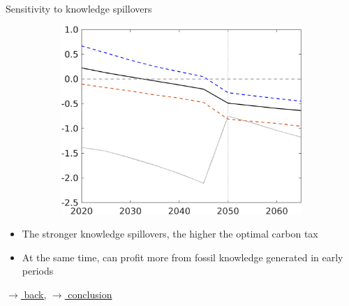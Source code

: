 \documentclass[11pt,aspectratio=169]{beamer}
\begin{document}
\begin{frame}{Sensitivity to knowledge spillovers}
\begin{figure}[h!!]
\begin{subfigure}{0.42\textwidth}
			\includegraphics[width=1\textwidth]{../codding_model/own_basedOnFried/optimalPol_010922_revision/figures/all_13Sept22/NewCalib_Sens_TvsNoT_dTaulAv_emnet1_Sun2_spillover0_knspil3_xgr0_nsk0_sep0_extern0_PV1_etaa0.79_lgd0.png}
		\end{subfigure}
	\end{figure}
	\vspace{2mm}
	\begin{block}{}
		\begin{itemize}
			\item The stronger knowledge spillovers, the higher the optimal carbon tax
			\item At the same time, can profit more from fossil knowledge generated in early periods
		\end{itemize}
	\end{block}	
	
	\vspace{-6mm}
	\hfill
	\hyperlink{backmec}{\tiny{$\rightarrow$ back,}}	\hyperlink{conc}{\tiny{$\rightarrow$ conclusion}}
\end{frame}
\end{document}
